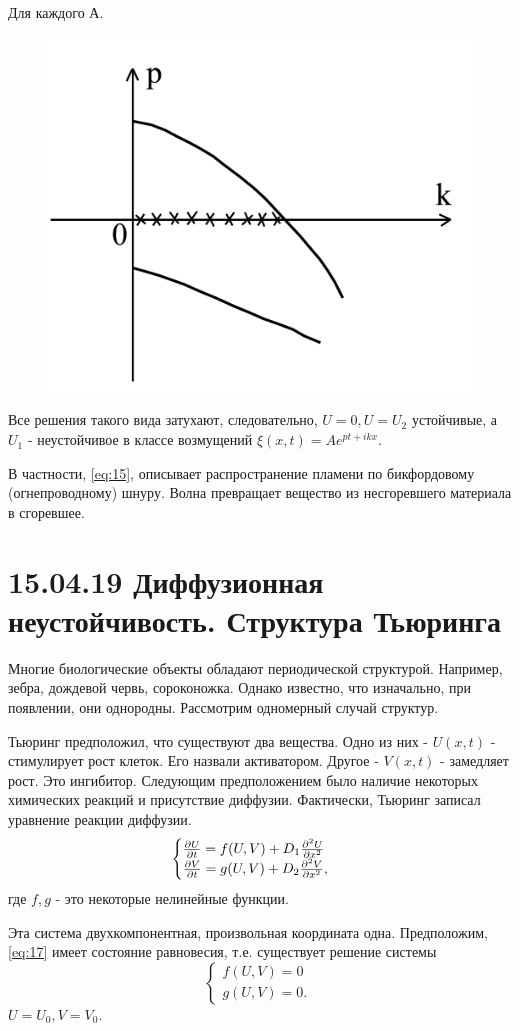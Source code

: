 Для каждого А.
\begin{figure}[H]
	\centering
	\includegraphics[width=0.5\linewidth]{fig/fig7.pdf}   
\end{figure}

Все решения такого вида затухают, следовательно, $U=0, U=U_2$ устойчивые, а $U_1$ - неустойчивое в классе возмущений $\xi(x,t)=A e^{pt+ikx}$.

В частности, \eqref{eq:15}, описывает распространение пламени по бикфордовому (огнепроводному) шнуру. Волна превращает вещество из несгоревшего материала в сгоревшее.


\section{15.04.19 Диффузионная неустойчивость. Структура Тьюринга}
Многие биологические объекты обладают периодической структурой. Например, зебра, дождевой червь, сороконожка. Однако известно, что изначально, при появлении, они однородны. Рассмотрим одномерный случай структур.

Тьюринг предположил, что существуют два вещества. Одно из них - $U(x,t)$ - стимулирует рост клеток. Его назвали активатором. Другое - $V(x,t)$ - замедляет рост. Это ингибитор. Следующим предположением было наличие некоторых химических реакций и присутствие диффузии. Фактически, Тьюринг записал уравнение реакции диффузии. 
\begin{equation}
\begin{cases}
		\pdv{U}{t}=f(U,V)+D_1 \pdv[2]{U}{x} \\
		\pdv{V}{t}=g(U,V)+D_2 \pdv[2]{V}{x},
	\end{cases}	\
	\label{eq:17}
\end{equation}
где $f,g$  - это некоторые нелинейные функции.

Эта система двухкомпонентная, произвольная координата одна. Предположим, \eqref{eq:17} имеет состояние равновесия, т.е. существует решение системы
\begin{equation}
\begin{cases}
		f(U,V)=0 \\
		g(U,V)=0.
	\end{cases}	\
	\label{eq:18}
\end{equation}
$U=U_0, V=V_0$.

